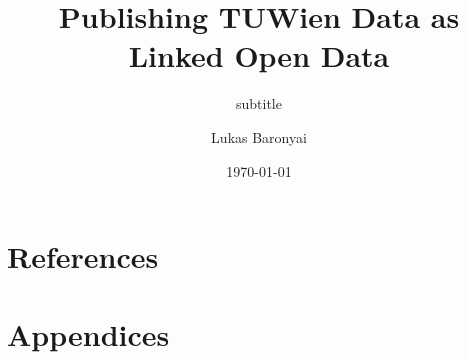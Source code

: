 \documentclass[pdftex,a4paper,10pt]{scrreprt}
\begin{document}
\pagestyle{empty} %
\titlehead{} 	%
\subject{TU Wien} 		%
\title{Publishing TUWien Data as Linked Open Data}
\subtitle{subtitle}
\author{Lukas Baronyai}
\date{\today}
\publishers{}
\maketitle					%
\tableofcontents 	%
\cleardoublepage %








\chapter{References}


\chapter{Appendices}
\appendix
\clearpage
{}
\listoffigures
\end{document}
